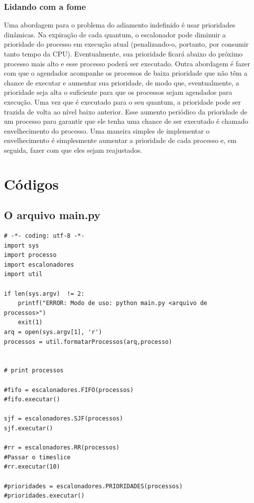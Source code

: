 \documentclass[times, 10pt,twocolumn]{article}
\begin{document}
\subsubsection{Lidando com a fome}
Uma abordagem para o problema do adiamento indefinido é usar prioridades dinâmicas. Na expiração de cada quantum, o escalonador pode diminuir a prioridade do processo em execução atual (penalizando-o, portanto, por consumir tanto tempo da CPU). Eventualmente, sua prioridade ficará abaixo do próximo processo mais alto e esse processo poderá ser executado.
Outra abordagem é fazer com que o agendador acompanhe os processos de baixa prioridade que não têm a chance de executar e aumentar sua prioridade, de modo que, eventualmente, a prioridade seja alta o suficiente para que os processos sejam agendados para execução. Uma vez que é executado para o seu quantum, a prioridade pode ser trazida de volta ao nível baixo anterior.
Esse aumento periódico da prioridade de um processo para garantir que ele tenha uma chance de ser executado é chamado envelhecimento do processo. Uma maneira simples de implementar o envelhecimento é simplesmente aumentar a prioridade de cada processo e, em seguida, fazer com que eles sejam reajustados. \cite{tutorialspoint}  
  
\section{Códigos}   
\subsection{O arquivo main.py} 
\begin{lstlisting}
# -*- coding: utf-8 -*- 
import sys
import processo 
import escalonadores
import util

if len(sys.argv)  != 2: 
	printf("ERROR: Modo de uso: python main.py <arquivo de processos>")
	exit(1)
arq = open(sys.argv[1], 'r')
processos = util.formatarProcessos(arq,processo) 


# print processos

#fifo = escalonadores.FIFO(processos)
#fifo.executar()  

sjf = escalonadores.SJF(processos)  
sjf.executar()

#rr = escalonadores.RR(processos)   
#Passar o timeslice
#rr.executar(10)

#prioridades = escalonadores.PRIORIDADES(processos) 
#prioridades.executar()  
\end{lstlisting}  
\end{document}
